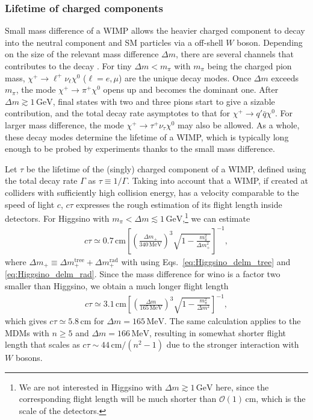 \documentclass[12pt,twoside,book]{article}
\begin{document}
\subsubsection*{Lifetime of charged components}

Small mass difference of a WIMP allows the heavier charged component to decay into the neutral component and SM particles via a off-shell $W$ boson.
Depending on the size of the relevant mass difference $\Delta m$, there are several channels that contributes to the decay \cite{Chen:1995yu}.
For tiny $\Delta m < m_\pi$ with $m_\pi$ being the charged pion mass, $\chi^{+} \to \ell^{+} \nu_\ell \chi^0$ ($\ell = e, \mu$) are the unique decay modes.
Once $\Delta m$ exceeds $m_\pi$, the mode $\chi^{+} \to \pi^{+} \chi^0$ opens up and becomes the dominant one.
After $\Delta m \gtrsim 1\, \mathrm{GeV}$, final states with two and three pions start to give a sizable contribution, and the total decay rate asymptotes to that for $\chi^{+} \to q' \bar{q} \chi^0$.
For larger mass difference, the mode $\chi^{+} \to \tau^{+} \nu_\tau \chi^0$ may also be allowed.
As a whole, these decay modes determine the lifetime of a WIMP, which is typically long enough to be probed by experiments thanks to the small mass difference.

Let $\tau$ be the lifetime of the (singly) charged component of a WIMP, defined using the total decay rate $\Gamma$ as $\tau \equiv 1/\Gamma$.
Taking into account that a WIMP, if created at colliders with sufficiently high collision energy, has a velocity comparable to the speed of light $c$, $c \tau$ expresses the rough estimation of its flight length inside detectors.
For Higgsino with $m_\pi < \Delta m \lesssim 1\,\mathrm{GeV}$,\footnote
{
  We are not interested in Higgsino with $\Delta m \gtrsim 1\, \mathrm{GeV}$ here, since the corresponding flight length will be much shorter than $\mathcal{O} (1)\, \mathrm{cm}$, which is the scale of the detectors.
}
we can estimate \cite{Chen:1995yu,Thomas:1998wy}
\begin{align}
  c \tau \simeq 0.7\, \mathrm{cm}
  \left[ \left( \frac{\Delta m_{+}}{340\,\mathrm{MeV}} \right)^3
  \sqrt{1 - \frac{m_\pi^2}{\Delta m_{+}^2}} \right]^{-1},
\end{align}
where $\Delta m_{+} \equiv \Delta m_{+}^{\mathrm{tree}} + \Delta m_{+}^{\mathrm{rad}}$ with using Eqs.~\eqref{eq:Higgsino_delm_tree} and \eqref{eq:Higgsino_delm_rad}.
Since the mass difference for wino is a factor two smaller than Higgsino, we obtain a much longer flight length
\begin{align}
  c \tau \simeq 3.1\, \mathrm{cm} \left[
  \left( \frac{\Delta m}{165\, \mathrm{MeV}} \right)^3
  \sqrt{1 - \frac{m_\pi^2}{\Delta m^2}} \right]^{-1},
\end{align}
which gives $c\tau \simeq 5.8\,\mathrm{cm}$ for $\Delta m = 165\,\mathrm{MeV}$.
The same calculation applies to the MDMs with $n \geq 5$ and $\Delta m = 166\, \mathrm{MeV}$, resulting in somewhat shorter flight length that scales as $c \tau \sim 44\, \mathrm{cm} / (n^2 - 1)$ \cite{Cirelli:2005uq} due to the stronger interaction with $W$ bosons.
\end{document}
